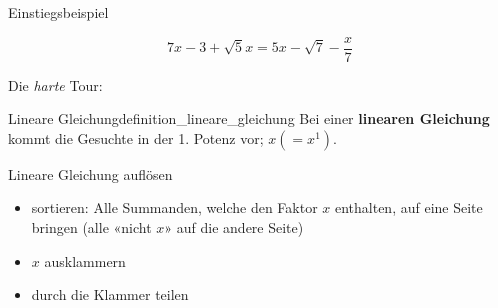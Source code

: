 \begin{beispiel}{Einstiegsbeispiel}{}

$$7x - 3 + \sqrt{5}x=5x - \sqrt{7} - \frac{x}7$$

  Die \textit{harte} Tour:
  

\end{beispiel}


\begin{definition}{Lineare Gleichung}{definition_lineare_gleichung}
  Bei einer \textbf{linearen Gleichung} kommt die Gesuchte in der
  1. Potenz vor; \zB $x (= x^1)$.
\end{definition}

\begin{rezept}{Lineare Gleichung auflösen}{}
  \begin{itemize}
  \item sortieren: Alle Summanden, welche den Faktor $x$ enthalten, auf eine Seite bringen (alle «nicht $x$» auf die andere Seite)
  \item $x$ ausklammern
  \item durch die Klammer teilen
    \end{itemize} 
  \end{rezept}
\newpage

